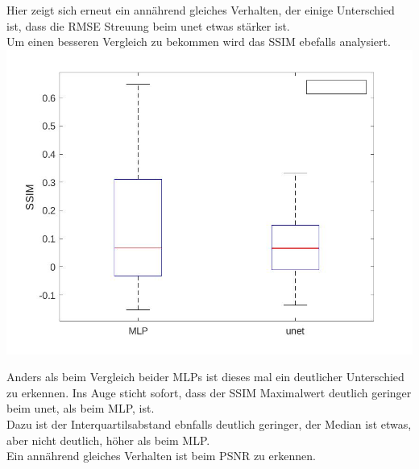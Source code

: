 \documentclass[8pt,a4paper]{article}
\begin{document}
Hier zeigt sich erneut ein annährend gleiches Verhalten, der einige Unterschied ist, dass die RMSE Streuung beim unet etwas stärker ist.\\
\newpage
Um einen besseren Vergleich zu bekommen wird das SSIM ebefalls analysiert.\\

\includegraphics[scale=0.2]{boxplotUnetSSIM.jpg}

Anders als beim Vergleich beider MLPs ist dieses mal ein deutlicher Unterschied zu erkennen.
Ins Auge sticht sofort, dass der SSIM Maximalwert deutlich geringer beim unet, als beim MLP, ist.\\
Dazu ist der Interquartilsabstand ebnfalls deutlich geringer, der Median ist etwas, aber nicht deutlich, höher als beim MLP.\\

Ein annährend gleiches Verhalten ist beim PSNR zu erkennen.\\
\end{document}
